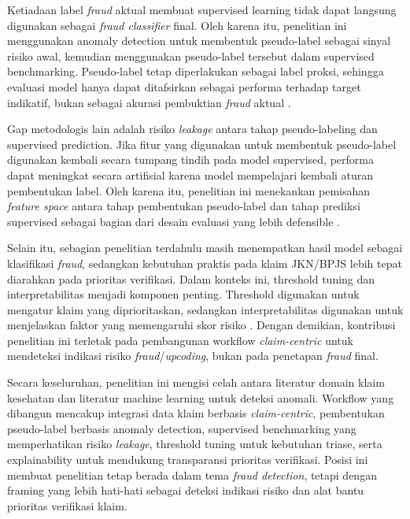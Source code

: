 Ketiadaan label \emph{fraud} aktual membuat supervised learning tidak dapat langsung digunakan sebagai \emph{fraud classifier} final. Oleh karena itu, penelitian ini menggunakan anomaly detection untuk membentuk pseudo-label sebagai sinyal risiko awal, kemudian menggunakan pseudo-label tersebut dalam supervised benchmarking. Pseudo-label tetap diperlakukan sebagai label proksi, sehingga evaluasi model hanya dapat ditafsirkan sebagai performa terhadap target indikatif, bukan sebagai akurasi pembuktian \emph{fraud} aktual \citep{lee2013,shekhar2023,meulemeester2025}.

Gap metodologis lain adalah risiko \emph{leakage} antara tahap pseudo-labeling dan supervised prediction. Jika fitur yang digunakan untuk membentuk pseudo-label digunakan kembali secara tumpang tindih pada model supervised, performa dapat meningkat secara artifisial karena model mempelajari kembali aturan pembentukan label. Oleh karena itu, penelitian ini menekankan pemisahan \emph{feature space} antara tahap pembentukan pseudo-label dan tahap prediksi supervised sebagai bagian dari desain evaluasi yang lebih defensible \citep{kapoor2023leakage,samala2020leakage}.

Selain itu, sebagian penelitian terdahulu masih menempatkan hasil model sebagai klasifikasi \emph{fraud}, sedangkan kebutuhan praktis pada klaim JKN/BPJS lebih tepat diarahkan pada prioritas verifikasi. Dalam konteks ini, threshold tuning dan interpretabilitas menjadi komponen penting. Threshold digunakan untuk mengatur klaim yang diprioritaskan, sedangkan interpretabilitas digunakan untuk menjelaskan faktor yang memengaruhi skor risiko \citep{shen2020,lipton2014thresholding,zhang2020thresholdmoving,ribeiro2016,lundberg2017}. Dengan demikian, kontribusi penelitian ini terletak pada pembangunan workflow \emph{claim-centric} untuk mendeteksi indikasi risiko \emph{fraud}/\emph{upcoding}, bukan pada penetapan \emph{fraud} final.

Secara keseluruhan, penelitian ini mengisi celah antara literatur domain klaim kesehatan dan literatur machine learning untuk deteksi anomali. Workflow yang dibangun mencakup integrasi data klaim berbasis \emph{claim-centric}, pembentukan pseudo-label berbasis anomaly detection, supervised benchmarking yang memperhatikan risiko \emph{leakage}, threshold tuning untuk kebutuhan triase, serta explainability untuk mendukung transparansi prioritas verifikasi. Posisi ini membuat penelitian tetap berada dalam tema \emph{fraud detection}, tetapi dengan framing yang lebih hati-hati sebagai deteksi indikasi risiko dan alat bantu prioritas verifikasi klaim.
